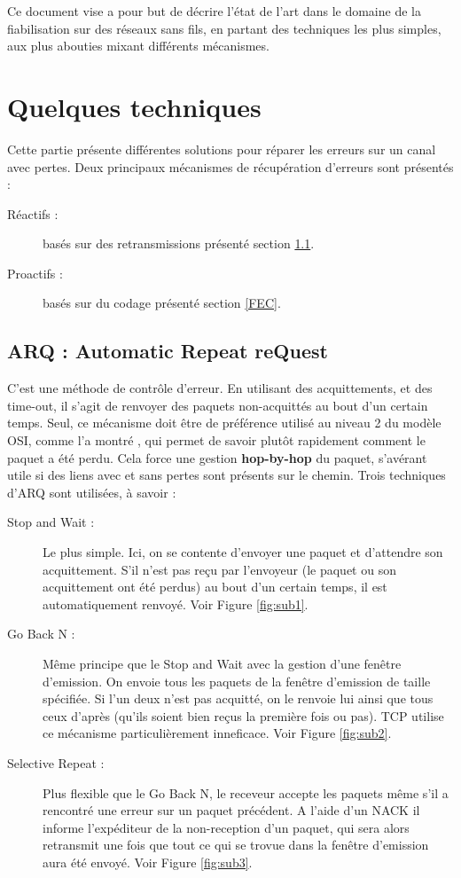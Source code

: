 \documentclass[frenchb]{article}
\begin{document}
Ce document vise a pour but de décrire l'état de l'art dans le domaine de la fiabilisation sur des réseaux sans fils, en partant des techniques les plus simples, aux plus abouties mixant différents mécanismes.


\clearpage

\section{Quelques techniques}
Cette partie présente différentes solutions pour réparer les erreurs sur un canal avec pertes. Deux principaux mécanismes de récupération d'erreurs sont présentés : 
\begin{description}
\item [Réactifs :]  basés sur des retransmissions présenté section \ref{ARQ}.
\item [Proactifs :] basés sur du codage présenté section \ref{FEC}.
\end{description}
\subsection{ARQ : Automatic Repeat reQuest}
\label{ARQ}
C'est une méthode de contrôle d'erreur. En utilisant des acquittements, et des time-out, il s'agit de renvoyer des paquets non-acquittés au bout d'un certain temps.
Seul, ce mécanisme doit être de préférence utilisé au niveau 2 du modèle OSI, comme l'a montré \cite{llfeqarq}, qui permet de savoir plutôt rapidement comment le paquet a été perdu. Cela force une gestion \textbf{hop-by-hop} du paquet, s'avérant utile si des liens avec et sans pertes sont présents sur le chemin.
Trois techniques d'ARQ sont utilisées, à savoir :
\begin{description}
\item[Stop and Wait :] Le plus simple. Ici, on se contente d'envoyer une paquet et d'attendre son acquittement. S'il n'est pas reçu par l'envoyeur (le paquet ou son acquittement ont été perdus) au bout d'un certain temps, il est automatiquement renvoyé. Voir Figure \ref{fig:sub1}.
\item[Go Back N :] Même principe que le Stop and Wait avec la gestion d'une fenêtre d'emission. On envoie tous les paquets de la fenêtre d'emission de taille spécifiée. Si l'un deux n'est pas acquitté, on le renvoie lui ainsi que tous ceux d'après (qu'ils soient bien reçus la première fois ou pas). TCP utilise ce mécanisme particulièrement inneficace. Voir Figure \ref{fig:sub2}.
\item[Selective Repeat :] Plus flexible que le Go Back N, le receveur accepte les paquets même s'il a rencontré une erreur sur un paquet précédent. A l'aide d'un NACK il informe l'expéditeur de la non-reception d'un paquet, qui sera alors retransmit une fois que tout ce qui se trovue dans la fenêtre d'emission aura été envoyé. Voir Figure \ref{fig:sub3}.
\end{description}
\end{document}
